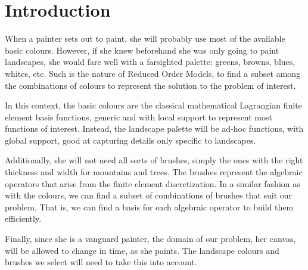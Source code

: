 \documentclass[thesis.tex]{subfiles}
\begin{document}
\section{Introduction}
When a painter sets out to paint, she will probably use most of the available basic colours.
However, if she knew beforehand she was only going to paint landscapes, 
she would fare well with a farsighted palette: greens, browns, blues, whites, etc.
Such is the nature of Reduced Order Models, 
to find a subset among the combinations of colours to represent the solution to the problem of interest.

In this context, the basic colours are the classical mathematical Lagrangian finite element basis functions, 
generic and with local support to represent most functions of interest.
Instead, the landscape palette will be ad-hoc functions, with global support, good at capturing details only specific to landscapes.

Additionally, she will not need all sorts of brushes, simply the ones with the right thickness and width for mountains and trees.
The brushes represent the algebraic operators that arise from the finite element discretization.
In a similar fashion as with the colours, we can find a subset of combinations of brushes that suit our problem.
That is, we can find a basis for each algebraic operator to build them efficiently.

Finally, since she is a vanguard painter, the domain of our problem, her canvas, will be allowed to change in time, as she paints.
The landscape colours and brushes we select will need to take this into account.



\end{document}
